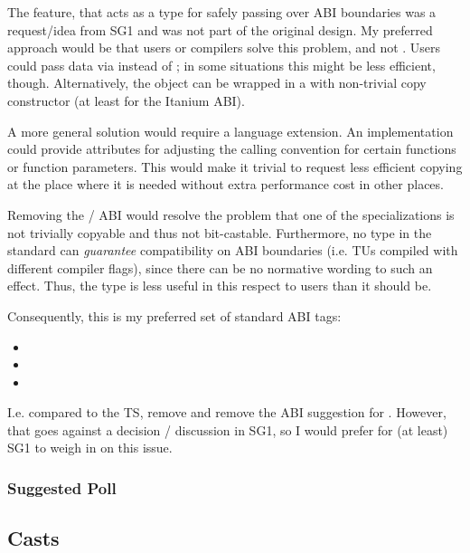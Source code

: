 The feature, that \stdx\simdabi{} acts as a type for safely passing over ABI boundaries was a request/idea from SG1 and was not part of the original design.
My preferred approach would be that users or compilers solve this problem, and not .
Users could pass data via  instead of \stdx{}; in some situations this might be less efficient, though.
Alternatively, the  object can be wrapped in a  with non-trivial copy constructor (at least for the Itanium ABI).

A more general solution would require a language extension.
An implementation could provide attributes for adjusting the calling convention for certain functions or function parameters.
This would make it trivial to request less efficient copying at the place where it is needed without extra performance cost in other places.

Removing the \stdx\simdabi{} / \std\simdabi{} ABI would resolve the problem that one of the  specializations is not trivially copyable and thus not bit-castable.
Furthermore, no type in the \CC{} standard can \emph{guarantee} compatibility on ABI boundaries (i.e. TUs compiled with different compiler flags), since there can be no normative wording to such an effect.
Thus, the type is less useful in this respect to users than it should be.

Consequently, this is my preferred set of standard ABI tags:
\begin{itemize}
  \item \simdabi{}
  \item \simdabi{}
  \item \simdabi{}
\end{itemize}
I.e. compared to the TS, remove  and remove the ABI suggestion for .
However, that goes against a decision / discussion in SG1, so I would prefer for (at least) SG1 to weigh in on this issue.

\subsubsection{Suggested Poll}


\subsection{Casts}\label{sec:question-casts}

